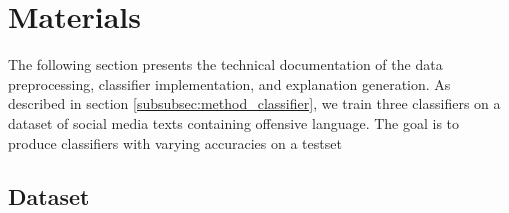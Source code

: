 \section{Materials}
The following section presents the technical documentation of the data preprocessing, classifier implementation, and explanation generation.\newline
As described in section \ref{subsubsec:method_classifier}, we train three classifiers on a dataset of social media texts containing offensive language. The goal is to produce classifiers with varying accuracies on a testset


\subsection{Dataset}

